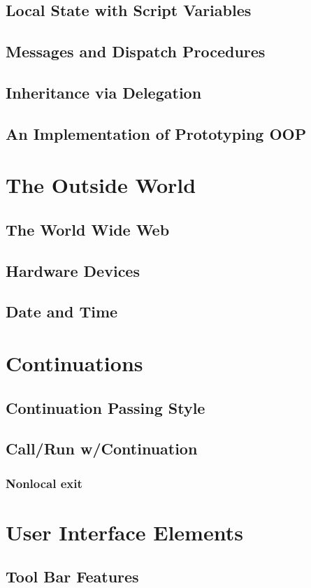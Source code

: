 \documentclass{report}
\begin{document}
\section{Local State with Script Variables}
\section{Messages and Dispatch Procedures}
\section{Inheritance via Delegation}
\section{An Implementation of Prototyping OOP}
\chapter{The Outside World}
\section{The World Wide Web}
\section{Hardware Devices}
\section{Date and Time}
\chapter{Continuations}
\section{Continuation Passing Style}
\section{Call/Run w/Continuation}
\subsection{Nonlocal exit}
\chapter{User Interface Elements}
\section{Tool Bar Features}
\end{document}
